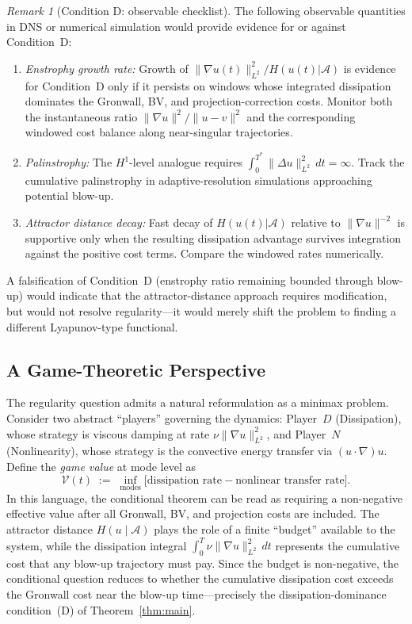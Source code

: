 \documentclass[12pt,a4paper]{article}
\theoremstyle{definition}
\theoremstyle{plain}
\theoremstyle{remark}
\newtheorem{remark}[definition]{Remark}
\begin{document}
\begin{remark}[Condition D: observable checklist]
\label{rem:condition-d-checklist}
The following observable quantities in DNS or numerical simulation would provide evidence for or against Condition~D:
\begin{enumerate}
\item \emph{Enstrophy growth rate:} Growth of $\|\nabla u(t)\|_{L^2}^2 / H(u(t)|\mathcal{A})$ is evidence for Condition~D only if it persists on windows whose integrated dissipation dominates the Gronwall, BV, and projection-correction costs. Monitor both the instantaneous ratio $\|\nabla u\|^2 / \|u - v\|^2$ and the corresponding windowed cost balance along near-singular trajectories.
\item \emph{Palinstrophy:} The $H^1$-level analogue requires $\int_0^{T^*} \|\Delta u\|_{L^2}^2\,dt = \infty$. Track the cumulative palinstrophy in adaptive-resolution simulations approaching potential blow-up.
\item \emph{Attractor distance decay:} Fast decay of $H(u(t)|\mathcal{A})$ relative to $\|\nabla u\|^{-2}$ is supportive only when the resulting dissipation advantage survives integration against the positive cost terms. Compare the windowed rates numerically.
\end{enumerate}
A falsification of Condition~D (enstrophy ratio remaining bounded through blow-up) would indicate that the attractor-distance approach requires modification, but would not resolve regularity---it would merely shift the problem to finding a different Lyapunov-type functional.
\end{remark}

\subsection{A Game-Theoretic Perspective}

The regularity question admits a natural reformulation as a minimax problem. Consider two abstract ``players'' governing the dynamics: Player~$D$ (Dissipation), whose strategy is viscous damping at rate $\nu\|\nabla u\|_{L^2}^2$, and Player~$N$ (Nonlinearity), whose strategy is the convective energy transfer via $(u\cdot\nabla)u$. Define the \emph{game value} at mode level as
\begin{equation}
    \mathcal{V}(t) \;:=\; \inf_{\text{modes}} \bigl[\text{dissipation rate} - \text{nonlinear transfer rate}\bigr].
\end{equation}
In this language, the conditional theorem can be read as requiring a non-negative effective value after all Gronwall, BV, and projection costs are included. The attractor distance $H(u\mid\mathcal{A})$ plays the role of a finite ``budget'' available to the system, while the dissipation integral $\int_0^T \nu\|\nabla u\|_{L^2}^2\,dt$ represents the cumulative cost that any blow-up trajectory must pay. Since the budget is non-negative, the conditional question reduces to whether
the cumulative dissipation cost exceeds the Gronwall cost near the
blow-up time---precisely the dissipation-dominance condition~(D)
of Theorem~\ref{thm:main}.
\end{document}
